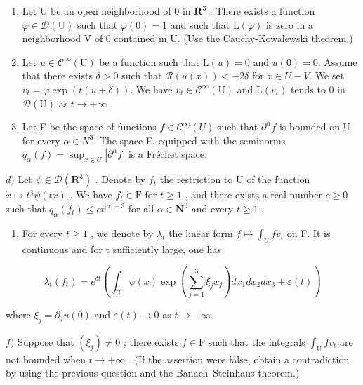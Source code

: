 \begin{enumerate}
\def\labelenumi{\alph{enumi})}
\item
  Let U be an open neighborhood of 0 in \(\mathbf{R}^3\) . There exists a function \(\varphi \in \mathcal{D}(\mathrm{U})\) such that \(\varphi(0) = 1\) and such that \(\mathrm{L}(\varphi)\) is zero in a neighborhood V of 0 contained in U. (Use the Cauchy-Kowalewski theorem.)
\item
  Let \(u \in \mathcal{C}^{\infty}(\mathrm{U})\) be a function such that \(\mathrm{L}(u) = 0\) and \(u(0) = 0\). Assume that there exists \(\delta > 0\) such that \(\mathcal{R}(u(x)) < -2\delta\) for \(x \in U - V\). We set \(v_{t} = \varphi \exp(t(u + \delta))\). We have \(v_{t} \in \mathcal{C}^{\infty}(\mathrm{U})\) and \(\mathrm{L}(v_{t})\) tends to 0 in \(\mathcal{D}(\mathrm{U})\) as \(t \to +\infty\) .
\item
  Let F be the space of functions \(f \in \mathcal{C}^{\infty}(U)\) such that \(\partial^{\alpha}f\) is bounded on U for every \(\alpha \in N^{3}\). The space F, equipped with the seminorms \(q_{\alpha}(f) = \sup_{x \in U} |\partial^{\alpha}f|\) is a Fréchet space.
\end{enumerate}

\(d)\) Let \(\psi\in\mathcal{D}(\mathbf{R}^{3})\) . Denote by \(f_{t}\) the restriction to U of the function \(x\mapsto t^{3}\psi(tx)\) . We have \(f_{t}\in\mathrm{F}\) for \(t\geqslant1\) , and there exists a real number \(c\geqslant0\) such that \(q_{\alpha}(f_{t})\leqslant ct^{|\alpha|+3}\) for all \(\alpha\in\mathbf{N}^{3}\) and every \(t\geqslant1\) .

\begin{enumerate}
\def\labelenumi{\alph{enumi})}
\setcounter{enumi}{4}
\tightlist
\item
  For every \(t \geqslant 1\) , we denote by \(\lambda_{t}\) the linear form \(f \mapsto \int_{U} fv_{t}\) on F. It is continuous and for t sufficiently large, one has
\end{enumerate}

\[
\lambda_ {t} (f _ {t}) = e ^ {\delta t} \left(\int_ {\mathrm{U}} \psi (x) \exp \left(\sum_ {j = 1} ^ {3} \xi_ {j} x _ {j}\right) d x _ {1} d x _ {2} d x _ {3} + \varepsilon (t)\right)
\]

where \(\xi_{j} = \partial_{j}u(0)\) and \(\varepsilon (t)\to 0\) as \(t\rightarrow +\infty\).

\(f)\) Suppose that \((\xi_j) \neq 0\) ; there exists \(f \in \mathrm{F}\) such that the integrals \(\int_{\mathrm{U}} f v_t\) are not bounded when \(t \to +\infty\) . (If the assertion were false, obtain a contradiction by using the previous question and the Banach–Steinhaus theorem.)


